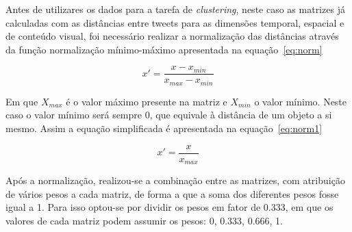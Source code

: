 Antes de utilizares os dados para a tarefa de \textit{clustering}, neste caso as matrizes já calculadas com as distâncias entre tweets para as dimensões temporal, espacial e de conteúdo visual, foi necessário realizar a normalização das distâncias através da função normalização mínimo-máximo apresentada na equação~\ref{eq:norm}

\begin{equation}
x' = \frac{x - x_{min} }{x_{max} - x_{min} }
\label{eq:norm}
\end{equation}

Em que $ X_{max} $ é o valor máximo presente na matriz e $ X_{min} $ o valor mínimo. Neste caso o valor mínimo será sempre 0, que equivale à distância de um objeto a si mesmo. Assim a equação simplificada é apresentada na equação~\ref{eq:norm1}

\begin{equation}
x' = \frac{x}{x_{max}}
\label{eq:norm1}
\end{equation}

Após a normalização, realizou-se a combinação entre as matrizes, com atribuição de vários pesos a cada matriz, de forma a que a soma dos diferentes pesos fosse igual a 1. Para isso optou-se por dividir os pesos em fator de 0.333, em que os valores de cada matriz podem assumir os pesos: 0, 0.333, 0.666, 1.

%

